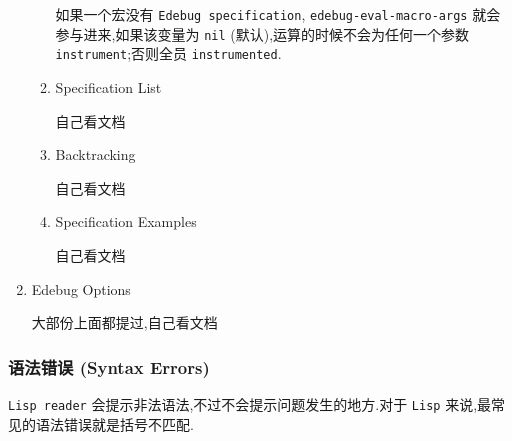 \documentclass[11pt]{article}
\begin{document}
\begin{enumerate}
\begin{enumerate}
如果一个宏没有 \texttt{Edebug specification}, \texttt{edebug-eval-macro-args} 就会参与进来,如果该变量为 \texttt{nil} (默认),运算的时候不会为任何一个参数 \texttt{instrument};否则全员 \texttt{instrumented}.

\item Specification List
\label{sec:org8c1ab1c}

自己看文档

\item Backtracking
\label{sec:org9704762}

自己看文档

\item Specification Examples
\label{sec:org35e6d13}

自己看文档
\end{enumerate}


\item Edebug Options
\label{sec:org4c0405c}

大部份上面都提过,自己看文档
\end{enumerate}


\subsubsection{语法错误 (Syntax Errors)}
\label{sec:orgb8061b0}

\texttt{Lisp reader} 会提示非法语法,不过不会提示问题发生的地方.对于 \texttt{Lisp} 来说,最常见的语法错误就是括号不匹配.
\end{document}
